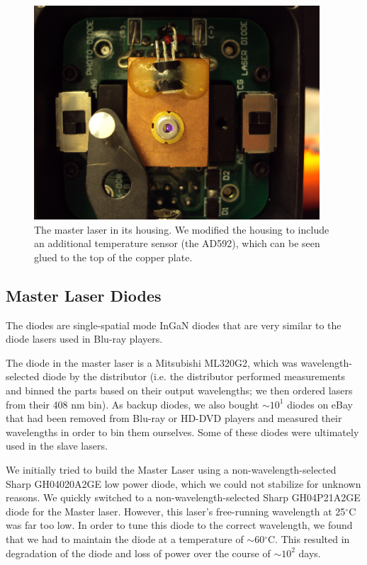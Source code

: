 \begin{figure}
\centerline{
\includegraphics[width=0.95\textwidth]{laser_on_in_housing.JPG}}
\caption[Photograph of Master Laser Diode]{\label{master_laser_interior_photo} The master laser in its housing. We modified the housing to include an additional temperature sensor (the AD592), which can be seen glued to the top of the copper plate.}
\end{figure}

\subsection{Master Laser Diodes}
The diodes are single-spatial mode InGaN diodes that are very similar to the diode lasers used in Blu-ray players. 

The diode in the master laser is a Mitsubishi ML320G2, which was wavelength-selected diode by the distributor (i.e. the distributor performed measurements and binned the parts based on their output wavelengths; we then ordered lasers from their 408 nm bin).
As backup diodes, we also bought $\sim 10^1$ diodes on eBay that had been removed from Blu-ray or HD-DVD players and measured their wavelengths in order to bin them ourselves. Some of these diodes were ultimately used in the slave lasers.

We initially tried to build the Master Laser using a non-wavelength-selected Sharp GH04020A2GE low power diode, which we could not stabilize for unknown reasons. We quickly switched to a non-wavelength-selected Sharp GH04P21A2GE diode for the Master laser. However, this laser's free-running wavelength at 25$^\circ$C was far too low. In order to tune this diode to the correct wavelength, we found that we had to maintain the diode at a temperature of $\sim$60$^\circ$C. This resulted in degradation of the diode and loss of power over the course of $\sim 10^2$ days.

